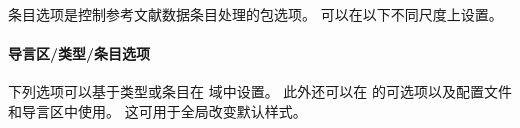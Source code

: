 
条目选项是控制参考文献数据条目处理的包选项。
可以在以下不同尺度上设置。

\paragraph{导言区/类型/条目选项}%
\label{use:opt:bib:hyb}


下列选项可以基于类型或条目在  域中设置。
此外还可以在  的可选项以及配置文件和导言区中使用。
这可用于全局改变默认样式。

